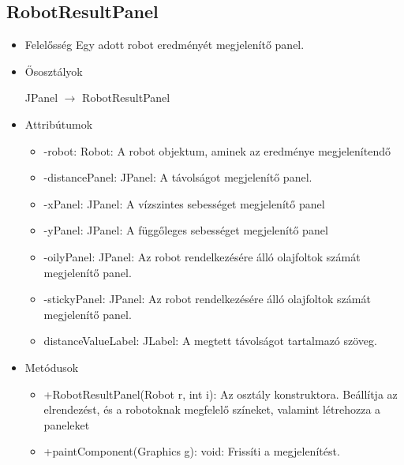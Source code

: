 \subsection{RobotResultPanel}
\begin{itemize}
	\item Felelősség\newline
	Egy adott robot eredményét megjelenítő panel.
	\item Ősosztályok\newline

		JPanel $\rightarrow$ RobotResultPanel
		
		\item Attribútumok
		\begin{itemize}
			\item -robot: Robot: A robot objektum, aminek az eredménye megjelenítendő
			\item -distancePanel: JPanel: A távolságot megjelenítő panel.
			\item -xPanel: JPanel: A vízszintes sebességet megjelenítő panel
			\item -yPanel: JPanel: A függőleges sebességet megjelenítő panel
			\item -oilyPanel: JPanel: Az robot rendelkezésére álló olajfoltok számát megjelenítő panel.
			\item -stickyPanel: JPanel: Az robot rendelkezésére álló olajfoltok számát megjelenítő panel.
			\item distanceValueLabel: JLabel: A megtett távolságot tartalmazó szöveg.
		\end{itemize}
		\item Metódusok
		\begin{itemize}
			\item +RobotResultPanel(Robot r, int i): Az osztály konstruktora. Beállítja az elrendezést, és a robotoknak megfelelő színeket, valamint létrehozza a paneleket
			\item +paintComponent(Graphics g): void: Frissíti a megjelenítést.
		\end{itemize}
	\end{itemize}
	
